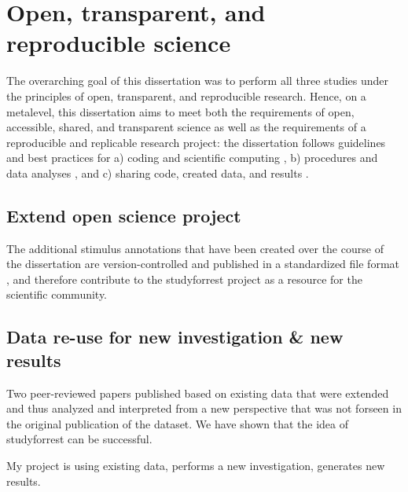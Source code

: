 \section{Open, transparent, and reproducible science}

The overarching goal of this dissertation was to perform all three studies under
the principles of open, transparent, and reproducible research.
%
Hence, on a metalevel, this dissertation aims to meet both the requirements of
open, accessible, shared, and transparent science \citep{watson2015will,
fecher2014open} as well as the requirements of a reproducible and replicable
research project:
%
the dissertation follows guidelines and best practices for a) coding and
scientific computing \citep{wilson2014best}, b) procedures and data analyses
\citep{nichols2017best, poldrack2017scanning, poldrack2019establishment}, and c)
sharing code, created data, and results \citep{eglen2017toward, nichols2017best,
pernet2015improving}.


\subsection{Extend open science project}

The additional stimulus annotations that have been created over the course of
the dissertation are version-controlled and published in a standardized file
format \citep{haeusler2021speechanno}, and therefore contribute to the
studyforrest project as a resource for the scientific community.

\subsection{Data re-use for new investigation \& new results}
%
Two peer-reviewed papers published based on existing data that were extended and
thus analyzed and interpreted from a new perspective that was not forseen in the
original publication of the dataset.
%
We have shown that the idea of studyforrest can be successful.

%
My project is using existing data, performs a new investigation, generates new
results.


